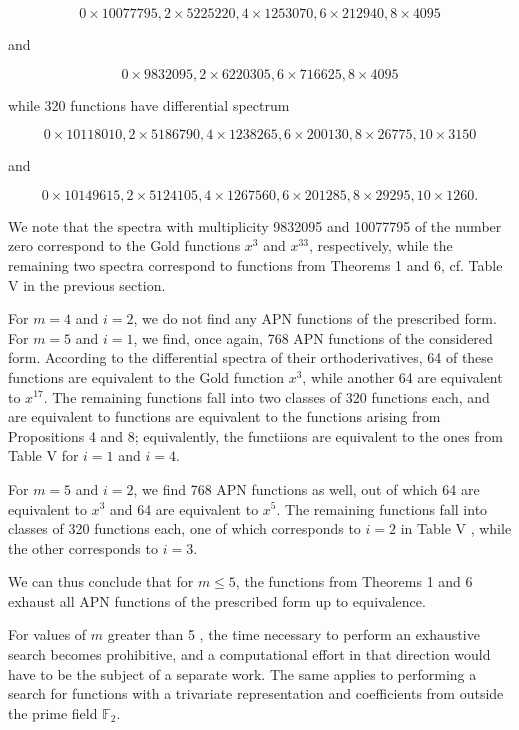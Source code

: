\documentclass[10pt]{article}
\begin{document}
$$
0 \times 10077795,2 \times 5225220,4 \times 1253070,6 \times 212940,8 \times 4095
$$

and

$$
0 \times 9832095,2 \times 6220305,6 \times 716625,8 \times 4095
$$

while 320 functions have differential spectrum

$$
0 \times 10118010,2 \times 5186790,4 \times 1238265,6 \times 200130,8 \times 26775,10 \times 3150
$$

and

$$
0 \times 10149615,2 \times 5124105,4 \times 1267560,6 \times 201285,8 \times 29295,10 \times 1260 .
$$

We note that the spectra with multiplicity 9832095 and 10077795 of the number zero correspond to the Gold functions $x^{3}$ and $x^{33}$, respectively, while the remaining two spectra correspond to functions from Theorems 1 and 6, cf. Table V in the previous section.

For $m=4$ and $i=2$, we do not find any APN functions of the prescribed form.\\
For $m=5$ and $i=1$, we find, once again, 768 APN functions of the considered form. According to the differential spectra of their orthoderivatives, 64 of these functions are equivalent to the Gold function $x^{3}$, while another 64 are equivalent to $x^{17}$. The remaining functions fall into two classes of 320 functions each, and are equivalent to functions are equivalent to the functions arising from Propositions 4 and 8; equivalently, the functiions are equivalent to the ones from Table V for $i=1$ and $i=4$.

For $m=5$ and $i=2$, we find 768 APN functions as well, out of which 64 are equivalent to $x^{3}$ and 64 are equivalent to $x^{5}$. The remaining functions fall into classes of 320 functions each, one of which corresponds to $i=2$ in Table V , while the other corresponds to $i=3$.

We can thus conclude that for $m \leq 5$, the functions from Theorems 1 and 6 exhaust all APN functions of the prescribed form up to equivalence.

For values of $m$ greater than 5 , the time necessary to perform an exhaustive search becomes prohibitive, and a computational effort in that direction would have to be the subject of a separate work. The same applies to performing a search for functions with a trivariate representation and coefficients from outside\\
the prime field $\mathbb{F}_{2}$.
\end{document}
